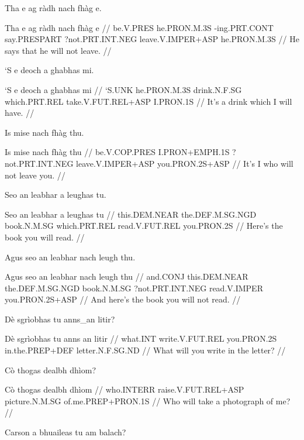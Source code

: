 \documentclass[a4paper,10pt]{article}
\begin{document}
\ex
\begingl
\glpre Tha e ag ràdh nach fhàg e. 

\vspace{4mm}
\gla Tha e ag ràdh nach fhàg e  //
\glb be.V.PRES he.PRON.M.3S -ing.PRT.CONT say.PRESPART ?not.PRT.INT.NEG leave.V.IMPER+ASP he.PRON.M.3S  //
\glft He says that he will not leave. //
\endgl
\xe

\ex
\begingl
\glpre ‘S e deoch a ghabhas mi. 

\vspace{4mm}
\gla ‘S e deoch a ghabhas mi  //
\glb ‘S.UNK he.PRON.M.3S drink.N.F.SG which.PRT.REL take.V.FUT.REL+ASP I.PRON.1S  //
\glft It's a drink which I will have. //
\endgl
\xe

\ex
\begingl
\glpre Is mise nach fhàg thu. 

\vspace{4mm}
\gla Is mise nach fhàg thu  //
\glb be.V.COP.PRES I.PRON+EMPH.1S ?not.PRT.INT.NEG leave.V.IMPER+ASP you.PRON.2S+ASP  //
\glft It's I who will not leave you. //
\endgl
\xe

\ex
\begingl
\glpre Seo an leabhar a leughas tu. 

\vspace{4mm}
\gla Seo an leabhar a leughas tu  //
\glb this.DEM.NEAR the.DEF.M.SG.NGD book.N.M.SG which.PRT.REL read.V.FUT.REL you.PRON.2S  //
\glft Here's the book you will read. //
\endgl
\xe

\ex
\begingl
\glpre Agus seo an leabhar nach leugh thu. 

\vspace{4mm}
\gla Agus seo an leabhar nach leugh thu  //
\glb and.CONJ this.DEM.NEAR the.DEF.M.SG.NGD book.N.M.SG ?not.PRT.INT.NEG read.V.IMPER you.PRON.2S+ASP  //
\glft And here's the book you will not read. //
\endgl
\xe

\ex
\begingl
\glpre Dè sgrìobhas tu anns\_an litir? 

\vspace{4mm}
\gla Dè sgrìobhas tu {anns an} litir  //
\glb what.INT write.V.FUT.REL you.PRON.2S in.the.PREP+DEF letter.N.F.SG.ND  //
\glft What will you write in the letter? //
\endgl
\xe

\ex
\begingl
\glpre Cò thogas dealbh dhìom? 

\vspace{4mm}
\gla Cò thogas dealbh dhìom  //
\glb who.INTERR raise.V.FUT.REL+ASP picture.N.M.SG of.me.PREP+PRON.1S  //
\glft Who will take a photograph of me? //
\endgl
\xe

\ex
\begingl
\glpre Carson a bhuaileas tu am balach? 
\end{document}
